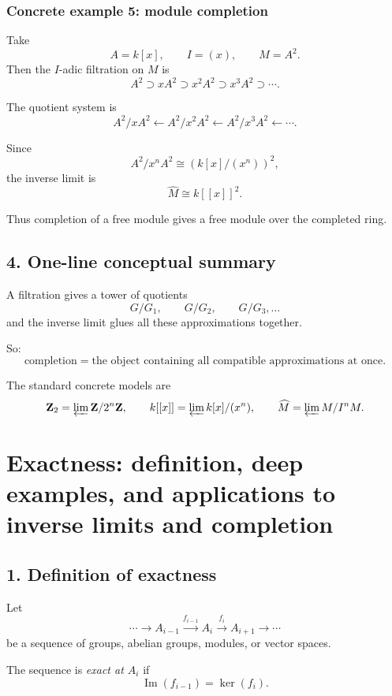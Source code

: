\documentclass[12pt,a4paper]{article}
\theoremstyle{plain}
\theoremstyle{definition}      %
\begin{document}
	\subsubsection*{Concrete example 5: module completion}
	
	Take
	\[
	A=k[x],\qquad I=(x),\qquad M=A^2.
	\]
	Then the \(I\)-adic filtration on \(M\) is
	\[
	A^2 \supset xA^2 \supset x^2A^2 \supset x^3A^2 \supset \cdots.
	\]
	
	The quotient system is
	\[
	A^2/xA^2 \xleftarrow{} A^2/x^2A^2 \xleftarrow{} A^2/x^3A^2 \xleftarrow{}\cdots.
	\]
	
	Since
	\[
	A^2/x^nA^2 \cong (k[x]/(x^n))^2,
	\]
	the inverse limit is
	\[
	\widehat M \cong k[[x]]^2.
	\]
	
	Thus completion of a free module gives a free module over the completed ring.
	
	\subsection*{4. One-line conceptual summary}
	
	A filtration gives a tower of quotients
	\[
	G/G_1,\qquad G/G_2,\qquad G/G_3,\dots
	\]
	and the inverse limit glues all these approximations together.
	
	So:
	\[
	\boxed{
		\text{completion}=
		\text{the object containing all compatible approximations at once}.
	}
	\]
	
	The standard concrete models are
	\[
	\mathbf Z_2=\varprojlim \mathbf Z/2^n\mathbf Z,
	\qquad
	k[[x]]=\varprojlim k[x]/(x^n),
	\qquad
	\widehat M=\varprojlim M/I^nM.
	\]
	
	\section*{Exactness: definition, deep examples, and applications to inverse limits and completion}
	
	\subsection*{1. Definition of exactness}
	
	Let
	\[
	\cdots \longrightarrow A_{i-1}\xrightarrow{f_{i-1}} A_i \xrightarrow{f_i} A_{i+1}\longrightarrow \cdots
	\]
	be a sequence of groups, abelian groups, modules, or vector spaces.
	
	The sequence is \emph{exact at \(A_i\)} if
	\[
	\operatorname{Im}(f_{i-1})=\ker(f_i).
	\]
	
\end{document}
